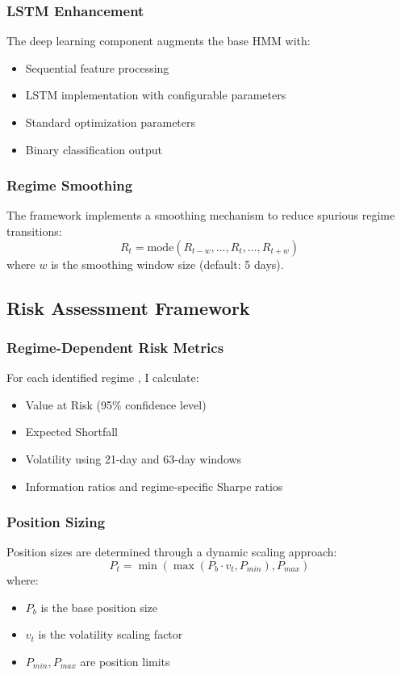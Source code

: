 \subsubsection{LSTM Enhancement}
The deep learning component \citep{hochreiter1997long, fischer2018deep} augments the base HMM with:
\begin{itemize}
    \item Sequential feature processing
    \item LSTM implementation with configurable parameters
    \item Standard optimization parameters
    \item Binary classification output
\end{itemize}

\subsubsection{Regime Smoothing}
The framework implements a smoothing mechanism to reduce spurious regime transitions:
\begin{equation}
R_t = \text{mode}(R_{t-w}, ..., R_t, ..., R_{t+w})
\end{equation}
where $w$ is the smoothing window size (default: 5 days).

\subsection{Risk Assessment Framework}

\subsubsection{Regime-Dependent Risk Metrics}
For each identified regime \citep{mcneil2000estimation}, I calculate:
\begin{itemize}
    \item Value at Risk (95\% confidence level)
    \item Expected Shortfall \citep{artzner1999coherent}
    \item Volatility using 21-day and 63-day windows
    \item Information ratios and regime-specific Sharpe ratios
\end{itemize}

\subsubsection{Position Sizing}
Position sizes are determined through a dynamic scaling approach:
\begin{equation}
P_t = \min(\max(P_b \cdot v_t, P_{min}), P_{max})
\end{equation}
where:
\begin{itemize}
    \item $P_b$ is the base position size
    \item $v_t$ is the volatility scaling factor
    \item $P_{min}, P_{max}$ are position limits
\end{itemize}

